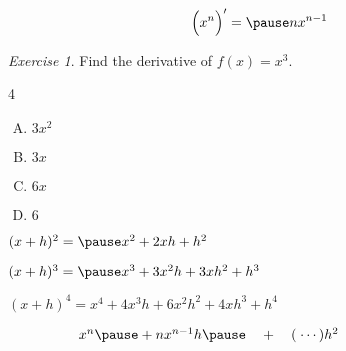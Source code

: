 \documentclass[17pt, handout]{beamer}
\theoremstyle{remark}
\newtheorem{plickers}{Exercise}
\begin{document}
\begin{frame}
\begin{theorem}
\[\Big(x^n\Big)' = \pause nx^{n-1}\]
\end{theorem}

\pause
\begin{plickers}
Find the derivative of $f(x) = x^3$.
\begin{multicols}4
\begin{enumerate}[A.]
\item $3x^2$ \item $3x$ \item $6x$ \item $6$
\end{enumerate}
\end{multicols}
\end{plickers}
\end{frame}

\begin{frame}
\begin{fact}
\par\bigskip
$(x+h)^2 = \pause x^2 + 2xh + h^2$ \pause\par\bigskip
$(x+h)^3 = \pause x^3 + 3x^2h + 3xh^2 + h^3$ \pause\par\bigskip
$(x+h)^4 = x^4 + 4x^3h + 6x^2h^2 + 4xh^3 + h^4$ \pause\par\bigskip\bigskip

%

$\phantom{(x+h)^n = {}}x^n \pause + nx^{n-1}h \pause \quad+\quad (\hspace{0.6ex}\cdots)h^2$ 

\end{fact}
\end{frame}
\end{document}
